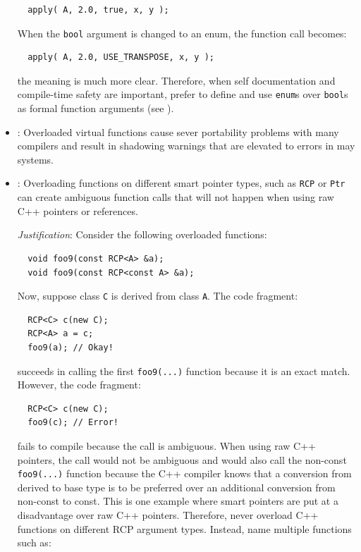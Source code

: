 \begin{itemize}
{\small\begin{verbatim}
  apply( A, 2.0, true, x, y );
\end{verbatim}}

When the {}\texttt{bool} argument is changed to an enum, the function call
becomes:

{\small\begin{verbatim}
  apply( A, 2.0, USE_TRANSPOSE, x, y );
\end{verbatim}}

the meaning is much more clear.  Therefore, when self documentation and
compile-time safety are important, prefer to define and use {}\texttt{enum}s
over {}\texttt{bool}s as formal function arguments (see {}\cite[Section
12.6]{CodeComplete2nd04}).

{}\item\GCGOverloadedVirtualFunctions: Overloaded virtual functions
cause sever portability problems with many compilers and result in
shadowing warnings that are elevated to errors in may systems.

{}\item\GCGAvoidSmartPtrFuncOverloads: Overloading functions on different
smart pointer types, such as {}\texttt{RCP} or {}\texttt{Ptr} can create
ambiguous function calls that will not happen when using raw C++ pointers or
references.

{}\textit{Justification}: Consider the following overloaded functions:

{\small\begin{verbatim}
  void foo9(const RCP<A> &a);
  void foo9(const RCP<const A> &a);
\end{verbatim}}

Now, suppose class {}\texttt{C} is derived from class {}\texttt{A}.  The code
fragment:

{\small\begin{verbatim}
  RCP<C> c(new C);
  RCP<A> a = c;
  foo9(a); // Okay!
\end{verbatim}}

succeeds in calling the first {}\texttt{foo9(...)} function because it is an
exact match.  However, the code fragment:

{\small\begin{verbatim}
  RCP<C> c(new C);
  foo9(c); // Error!
\end{verbatim}}

fails to compile because the call is ambiguous.  When using raw C++ pointers,
the call would not be ambiguous and would also call the non-const
{}\texttt{foo9(...)} function because the C++ compiler knows that a conversion
from derived to base type is to be preferred over an additional conversion
from non-const to const.  This is one example where smart pointers are put at
a disadvantage over raw C++ pointers.  Therefore, never overload C++ functions
on different RCP argument types.  Instead, name multiple functions such as:


\end{itemize}
